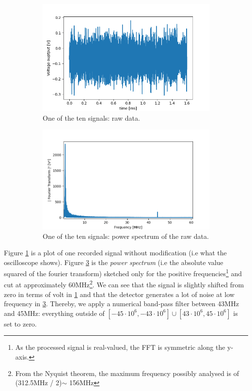\documentclass[11pt]{report}
\begin{document}
\begin{figure}[h!]
\centering
\begin{subfigure}{.48\textwidth}
  \centering
  \includegraphics[width=1.1\linewidth]{st-f-rough}
  \caption{One of the ten signals: raw data.}
  \label{fig:st-f-rough}
\end{subfigure}%
\hspace{1em}%
\begin{subfigure}{.48\textwidth}
  \centering
  \includegraphics[width=1.1\linewidth]{st-fft-rough}
  \caption{One of the ten signals: power spectrum of the raw data.}
  \label{fig:st-fft-rough}
\end{subfigure}
\caption{}
\end{figure}

Figure \ref{fig:st-f-rough} is a plot of one recorded signal without modification (i.e what the oscilloscope shows). Figure \ref{fig:st-fft-rough} is the \textit{power spectrum} (i.e the absolute value squared of the fourier transform) sketched only for the positive frequencies\footnote{As the processed signal is real-valued, the FFT is symmetric along the y-axis.} and cut at approximately 60MHz\footnote{From the Nyquist theorem, the maximum frequency possibly analysed is of (312.5MHz / 2)$\sim$ 156MHz}. We can see that the signal is slightly shifted from zero in terms of volt in \ref{fig:st-f-rough} and that the detector generates a lot of noise at low frequency in \ref{fig:st-fft-rough}. Thereby, we apply a numerical band-pass filter between 43MHz and 45MHz: everything outside of $\left[-45\cdot 10^6, -43\cdot 10^6 \right] \cup \left[43\cdot 10^6, 45\cdot 10^6 \right]$ is set to zero.
\end{document}
